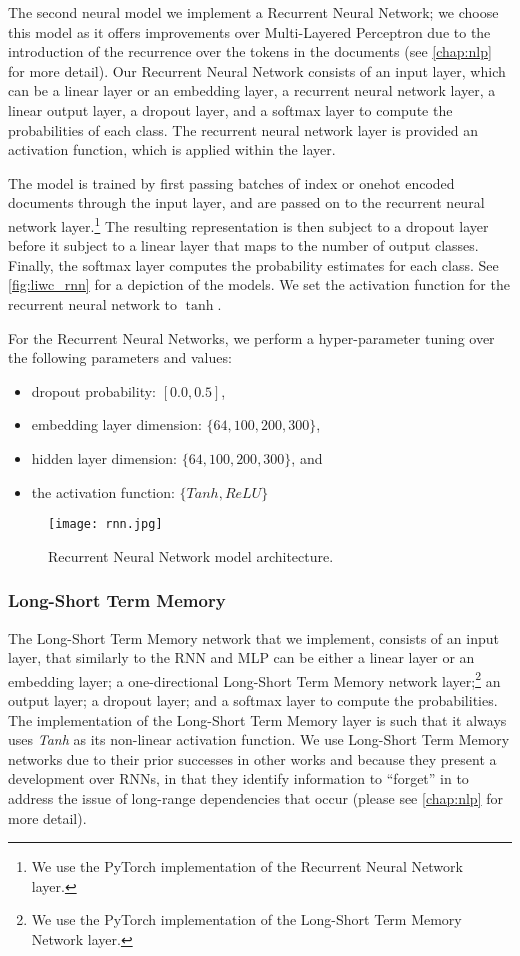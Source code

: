 The second neural model we implement a Recurrent Neural Network; we choose this model as it offers improvements over Multi-Layered Perceptron due to the introduction of the recurrence over the tokens in the documents (see \autoref{chap:nlp} for more detail). Our Recurrent Neural Network consists of an input layer, which can be a linear layer or an embedding layer, a recurrent neural network layer, a linear output layer, a dropout layer, and a softmax layer to compute the probabilities of each class. The recurrent neural network layer is provided an activation function, which is applied within the layer.

The model is trained by first passing batches of index or onehot encoded documents through the input layer, and are passed on to the recurrent neural network layer.\footnote{We use the PyTorch implementation of the Recurrent Neural Network layer.} The resulting representation is then subject to a dropout layer before it subject to a linear layer that maps to the number of output classes. Finally, the softmax layer computes the probability estimates for each class. See \autoref{fig:liwc_rnn} for a depiction of the models. We set the activation function for the recurrent neural network to $\tanh$.

For the Recurrent Neural Networks, we perform a hyper-parameter tuning over the following parameters and values:

\begin{itemize}
  \item dropout probability: $[0.0, 0.5]$,
  \item embedding layer dimension: $\{64, 100, 200, 300\}$,
  \item hidden layer dimension: $\{64, 100, 200, 300\}$, and
   \item the activation function: $\{Tanh, ReLU\}$
\end{itemize}

\begin{figure}
  \centering
  \texttt{[image: rnn.jpg]}
  \caption{Recurrent Neural Network model architecture.}
  \label{fig:liwc_rnn}
\end{figure}

\subsubsection{Long-Short Term Memory}

The Long-Short Term Memory network that we implement, consists of an input layer, that similarly to the RNN and MLP can be either a linear layer or an embedding layer; a one-directional Long-Short Term Memory network layer;\footnote{We use the PyTorch implementation of the Long-Short Term Memory Network layer.} an output layer; a dropout layer; and a softmax layer to compute the probabilities. The implementation of the Long-Short Term Memory layer is such that it always uses \textit{Tanh} as its non-linear activation function. We use Long-Short Term Memory networks due to their prior successes in other works \cite{CITE: LSTM papers} and because they present a development over RNNs, in that they identify information to ``forget'' in to address the issue of long-range dependencies that occur (please see \autoref{chap:nlp} for more detail).


